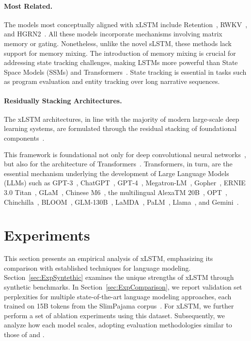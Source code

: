 \paragraph{Most Related.} The models most conceptually aligned with xLSTM include Retention~\citep{Sun:23arxiv}, RWKV~\citep{Peng:23arxivshort,Peng:24arxivshort}, and HGRN2~\citep{Qin:24arxiv}. All these models incorporate mechanisms involving matrix memory or gating. Nonetheless, unlike the novel sLSTM, these methods lack support for memory mixing. The introduction of memory mixing is crucial for addressing state tracking challenges, making LSTMs more powerful than State Space Models (SSMs) and Transformers~\citep{Merrill:24,Deletang:23}. State tracking is essential in tasks such as program evaluation and entity tracking over long narrative sequences.

\paragraph{Residually Stacking Architectures.} The xLSTM architectures, in line with the majority of modern large-scale deep learning systems, are formulated through the residual stacking of foundational components~\citep{Srivastava:15,He:16}.

This framework is foundational not only for deep convolutional neural networks~\citep{He:16}, but also for the architecture of Transformers~\citep{Vaswani:17}. Transformers, in turn, are the essential mechanism underlying the development of Large Language Models (LLMs) such as GPT-3~\citep{Brown:20short}, ChatGPT~\citep{Schulman:22short}, GPT-4~\citep{Achiam:23gpt4short}, Megatron-LM~\citep{Shoeybi:19}, Gopher~\citep{Rae:21short}, ERNIE 3.0 Titan~\citep{Wang:21arxivshort}, GLaM~\citep{Du:21glamshort}, Chinese M6~\citep{Lin:21}, the multilingual AlexaTM 20B~\citep{Soltan:22}, OPT~\citep{Zhang:22opt}, Chinchilla~\citep{Hoffmann:22short}, BLOOM~\citep{Scao:22arxivshort}, GLM-130B~\citep{Zeng:22arxivshort}, LaMDA~\citep{Thoppilan:22short}, PaLM~\citep{Chowdhery:22short}, Llama~\citep{Touvron:23arxiv}, and Gemini~\citep{GeminiTeam:23arxiv,Reid:24arxiv}.

\section{Experiments}
\label{sec:Exp}

This section presents an empirical analysis of xLSTM, emphasizing its comparison with established techniques for language modeling. Section~\ref{sec:ExpSyntethic} examines the unique strengths of xLSTM through synthetic benchmarks. In Section~\ref{sec:ExpComparison}, we report validation set perplexities for multiple state-of-the-art language modeling approaches, each trained on 15B tokens from the SlimPajama corpus~\citep{Soboleva:23}. For xLSTM, we further perform a set of ablation experiments using this dataset. Subsequently, we analyze how each model scales, adopting evaluation methodologies similar to those of \citet{Kaplan:20} and \citet{Brown:20short}.

